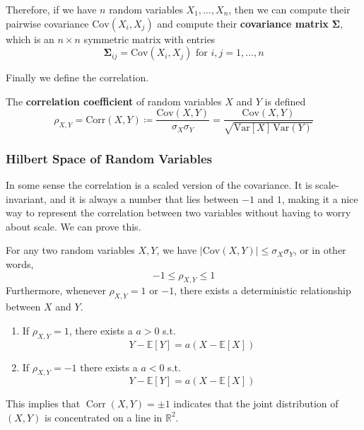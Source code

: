 \documentclass{article}
\DeclareMathOperator{\Corr}{Corr}
\begin{document}
    Therefore, if we have $n$ random variables $X_1, \ldots, X_n$, then we can compute their pairwise covariance $\mathrm{Cov}(X_i, X_j)$ and compute their \textbf{covariance matrix} $\boldsymbol{\Sigma}$, which is an $n \times n$ symmetric matrix with entries 
    \begin{equation}
      \boldsymbol{\Sigma}_{ij} = \mathrm{Cov}(X_i, X_j) \text{ for } i, j = 1, \ldots, n
    \end{equation}

    Finally we define the correlation. 

    \begin{definition}
      The \textbf{correlation coefficient} of random variables $X$ and $Y$ is defined 
      \begin{equation}
        \rho_{X, Y} = \mathrm{Corr}(X, Y) \coloneqq \frac{\mathrm{Cov}(X, Y)}{\sigma_X \sigma_Y} = \frac{\mathrm{Cov}(X, Y)}{\sqrt{\mathrm{Var}[X] \, \mathrm{Var}(Y)}}
      \end{equation}
    \end{definition}

    \subsubsection{Hilbert Space of Random Variables}

      In some sense the correlation is a scaled version of the covariance. It is scale-invariant, and it is always a number that lies between $-1$ and $1$, making it a nice way to represent the correlation between two variables without having to worry about scale. We can prove this. 

      \begin{theorem}
        For any two random variables $X, Y$, we have $|\mathrm{Cov}(X, Y)| \leq \sigma_X \sigma_Y$, or in other words, 
        \begin{equation}
          -1 \leq \rho_{X, Y} \leq 1
        \end{equation}
        Furthermore, whenever $\rho_{X, Y} = 1$ or $-1$, there exists a deterministic relationship between $X$ and $Y$. 
        \begin{enumerate}
          \item If $\rho_{X, Y} = 1$, there exists a $a > 0$ s.t. 
          \begin{equation}
            Y - \mathbb{E}[Y] = a (X - \mathbb{E}[X])
          \end{equation}
          \item If $\rho_{X, Y} = -1$ there exists a $a < 0$ s.t. 
          \begin{equation}
            Y - \mathbb{E}[Y] = a (X - \mathbb{E}[X])
          \end{equation}
        \end{enumerate}
        This implies that $\Corr(X, Y) = \pm 1$ indicates that the joint distribution of $(X, Y)$ is concentrated on a line in $\mathbb{R}^2$. 
      \end{theorem}
\end{document}
